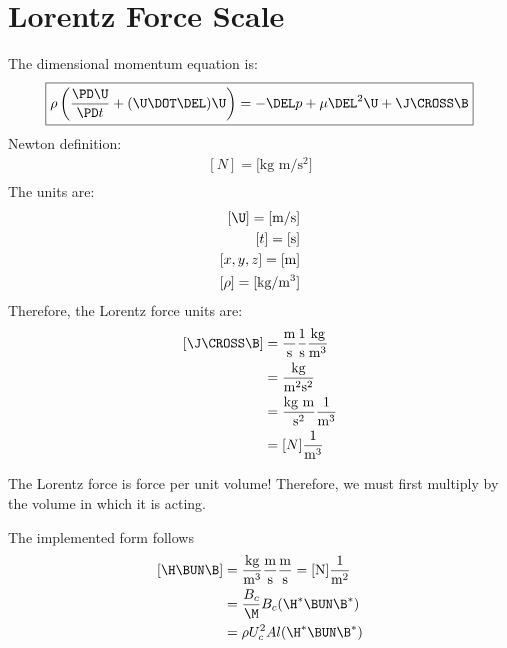 \documentclass[11pt]{article}
\begin{document}
\doublespacing
\MOONSTITLE
\maketitle

\section{Lorentz Force Scale}
The dimensional momentum equation is:
\begin{equation}
	\boxed{
	\rho \left( \frac{\PD \U}{\PD t} + (\U \DOT \DEL) \U \right) =
	-\DEL p + \mu \DEL^2 \U + \J \CROSS \B
	}
\end{equation}
Newton definition:
\begin{equation}\begin{aligned}
	[N] = \text{[kg m/s$^2$]} \\
\end{aligned}\end{equation}
The units are:
\begin{equation}\begin{aligned}
	[\U] = \text{[m/s]} \\
	[t] = \text{[s]} \\
	[x,y,z] = \text{[m]} \\
	[\rho] = \text{[kg/m$^3$]} \\
\end{aligned}\end{equation}
Therefore, the Lorentz force units are:
\begin{equation}\begin{aligned}
	[\J \CROSS \B] & = \frac{\text{m}}{\text{s}} \frac{1}{\text{s}} \frac{\text{kg}}{\text{m}^3} \\
	& = \frac{\text{kg}}{\text{m}^2 \text{s}^2} \\
	& = \frac{\text{kg} \text{ m}}{\text{s}^2} \frac{1}{\text{m}^3} \\
	& = [N] \frac{1}{\text{m}^3} \\
\end{aligned}\end{equation}

The Lorentz force is force per unit volume! Therefore, we must first multiply by the volume in which it is acting.


The implemented form follows
\begin{equation}\begin{aligned}
	[\H \BUN \B] & = \frac{\text{kg}}{\text{m}^3} \frac{\text{m}}{\text{s}} \frac{\text{m}}{\text{s}} = [\text{N}] \frac{1}{\text{m}^2} \\
	             & = \frac{B_c}{\M} B_c (\H^* \BUN \B^*) \\
	             & = \rho U_c^2 Al (\H^* \BUN \B^*) \\
\end{aligned}\end{equation}
\end{document}
